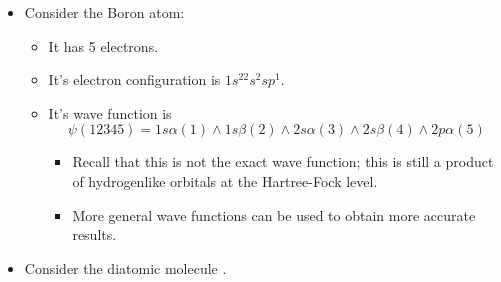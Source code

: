 \documentclass[../notes.tex]{subfiles}
\begin{document}
\begin{itemize}
\begin{itemize}
    \end{itemize}
    \item Consider the Boron atom:
    \begin{itemize}
        \item It has 5 electrons.
        \item It's electron configuration is $1s^22s^2sp^1$.
        \item It's wave function is
        \begin{equation*}
            \psi(12345) = 1s\alpha(1)\wedge 1s\beta(2)\wedge 2s\alpha(3)\wedge 2s\beta(4)\wedge 2p\alpha(5)
        \end{equation*}
        \begin{itemize}
            \item Recall that this is not the exact wave function; this is still a product of hydrogenlike orbitals at the Hartree-Fock level.
            \item More general wave functions can be used to obtain more accurate results.
        \end{itemize}
    \end{itemize}
    \item Consider the diatomic molecule .
    \begin{figure}[H]
        \centering
\end{figure}
\end{itemize}
\end{document}
